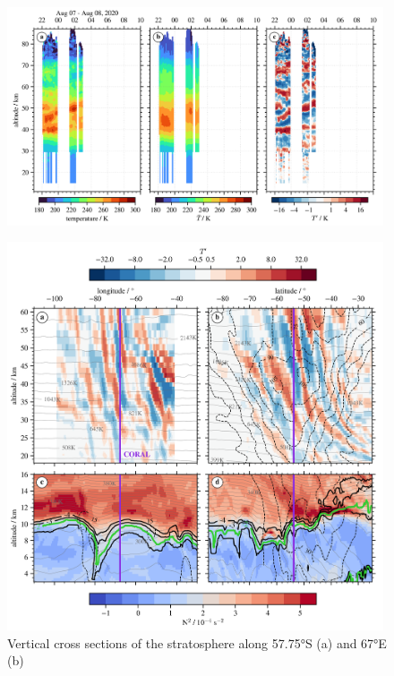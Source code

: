 \begin{figure}[tbp]
    \centering
    \includegraphics[width=0.99\textwidth]{figures_lidar/coral_event_20200807.png}
    \caption{}
\end{figure}


\begin{figure}[tbp]
    \centering
    \includegraphics[width=0.99\textwidth]{figures_lidar/era5_trop_strat_2.png}
    \caption{Vertical cross sections of the stratosphere along 57.75°S (a) and 67°E (b)}
\end{figure}
